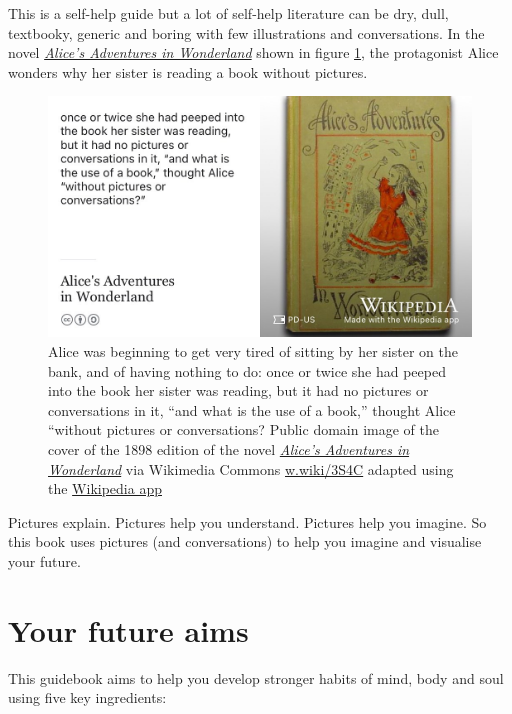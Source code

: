 \documentclass[
]{book}
\begin{document}
This is a self-help guide but a lot of self-help literature can be dry, dull, textbooky, generic and boring with few illustrations and conversations. In the novel \emph{\href{https://en.wikipedia.org/wiki/Alice\%27s_Adventures_in_Wonderland}{Alice's Adventures in Wonderland}} \citep{wonderland} shown in figure \ref{fig:aiw-fig}, the protagonist Alice wonders why her sister is reading a book without pictures.

\begin{figure}
\includegraphics[width=0.99\linewidth]{images/alicequotation} \caption{Alice was beginning to get very tired of sitting by her sister on the bank, and of having nothing to do: once or twice she had peeped into the book her sister was reading, but it had no pictures or conversations in it, ``and what is the use of a book,'' thought Alice ``without pictures or conversations? \citep{wonderland} Public domain image of the cover of the 1898 edition of the novel \emph{\href{https://en.wikipedia.org/wiki/Alice\%27s_Adventures_in_Wonderland}{Alice's Adventures in Wonderland}} via Wikimedia Commons \href{https://w.wiki/3S4C}{w.wiki/3S4C} adapted using the \href{https://apps.apple.com/us/app/wikipedia/id324715238}{Wikipedia app}}\label{fig:aiw-fig}
\end{figure}



Pictures explain. Pictures help you understand. Pictures help you imagine. So this book uses pictures (and conversations) to help you imagine and visualise your future.

\hypertarget{vaccine}{%
\section{Your future aims}\label{vaccine}}

This guidebook aims to help you develop stronger habits of mind, body and soul using five key ingredients:
\end{document}
